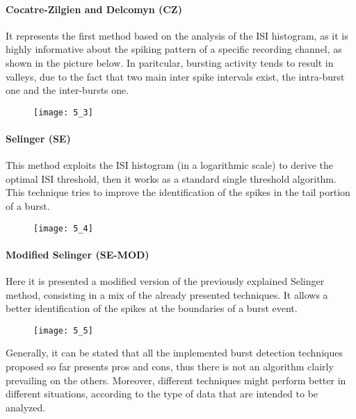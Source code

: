 \paragraph{Cocatre-Zilgien and Delcomyn (CZ)} It represents the first method based on the
analysis of the ISI histogram, as it is highly informative about the spiking pattern of
a specific recording channel, as shown in the picture below. In paritcular, bursting
activity tends to result in valleys, due to the fact that two main inter spike intervals
exist, the intra-burst one and the inter-bursts one.
\begin{figure}[H]
    \texttt{[image: 5\_3]}
    \centering
\end{figure}

\paragraph{Selinger (SE)} This method exploits the ISI histogram (in a logarithmic scale)
to derive the optimal ISI threshold, then it works as a standard single threshold algorithm.
This technique tries to improve the identification of the spikes in the tail portion of a
burst.
\begin{figure}[H]
    \texttt{[image: 5\_4]}
    \centering
\end{figure}

\paragraph{Modified Selinger (SE-MOD)} Here it is presented a modified version of the
previously explained Selinger method, consisting in a mix of the already presented
techniques. It allows a better identification of the spikes at the boundaries of a
burst event.
\begin{figure}[H]
    \texttt{[image: 5\_5]}
    \centering
\end{figure}

Generally, it can be stated that all the implemented burst detection techniques proposed so
far presents pros and cons, thus there is not an algorithm clairly prevailing on the others.
Moreover, different techniques might perform better in different situations, according to
the type of data that are intended to be analyzed.